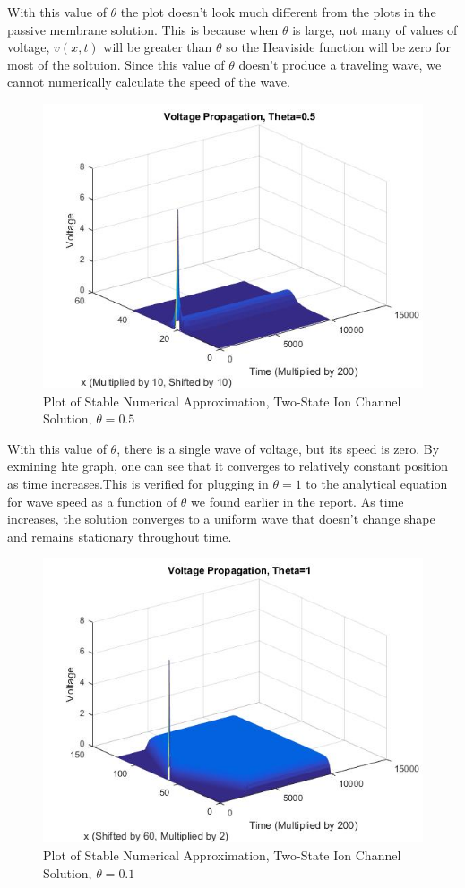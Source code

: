 \documentclass[12pt]{article}
\begin{document}
With this value of $\theta$ the plot doesn't look much different from the plots in the passive membrane solution. This is because when $\theta$ is large, not many of values of voltage, $v(x,t)$ will be greater than $\theta$ so the Heaviside function will be zero for most of the soltuion. Since this value of $\theta$ doesn't produce a traveling wave, we cannot numerically calculate the speed of the wave. 
\begin{figure}[H]
  \includegraphics[width=\linewidth]{thetatwo.jpg}
  \caption{Plot of Stable Numerical Approximation, Two-State Ion Channel Solution, $\theta=0.5$}
  \label{fig:sketch5}
\end{figure}
With this value of $\theta$, there is a single wave of voltage, but its speed is zero. By exmining hte graph, one can see that it converges to relatively constant position as time increases.This is verified for plugging in $\theta=1$ to the analytical equation for wave speed as a function of $\theta$ we found earlier in the report. As time increases, the solution converges to a uniform wave that doesn't change shape and remains stationary throughout time.
\begin{figure}[H]
  \includegraphics[width=\linewidth]{thetathree.jpg}
  \caption{Plot of Stable Numerical Approximation, Two-State Ion Channel Solution, $\theta=0.1$}
  \label{fig:sketch6}
\end{figure}
\end{document}
